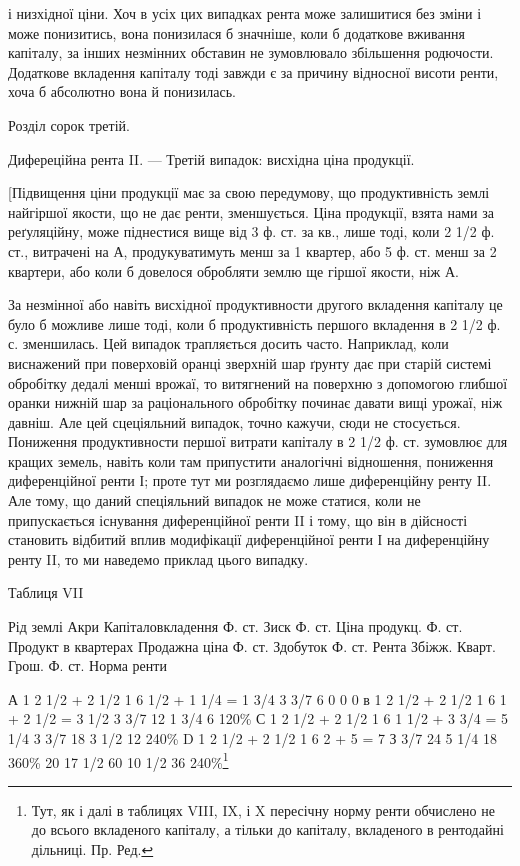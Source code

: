 \parcont{}  %
і низхідної ціни. Хоч в усіх цих випадках рента може залишитися без зміни
і може понизитись, вона понизилася б значніше, коли б додаткове вживання
капіталу, за інших незмінних обставин не зумовлювало збільшення родючости. Додаткове вкладення
капіталу тоді завжди є за причину відносної висоти ренти,
хоча б абсолютно вона й понизилась.

Розділ сорок третій.

Дифереційна рента II. — Третій випадок:
висхідна ціна продукції.

[Підвищення ціни продукції має за свою передумову, що продуктивність землі
найгіршої якости, що не дає ренти, зменшується. Ціна продукції, взята нами за
реґуляційну, може піднестися вище від 3 ф. ст. за кв., лише тоді, коли 2 1/2 ф. ст.,
витрачені на А, продукуватимуть менш за 1 квартер, або 5 ф. ст. менш за
2 квартери, або коли б довелося обробляти землю ще гіршої якости, ніж А.

За незмінної або навіть висхідної продуктивности другого вкладення капіталу
це було б можливе лише тоді, коли б продуктивність першого вкладення в 2 1/2 ф. с.
зменшилась. Цей випадок трапляється досить часто. Наприклад, коли виснажений
при поверховій оранці зверхній шар ґрунту дає при старій системі обробітку
дедалі менші врожаї, то витягнений на поверхню з допомогою глибшої
оранки нижній шар за раціонального обробітку починає давати вищі
урожаї, ніж давніш. Але цей сцеціяльний випадок, точно кажучи, сюди не
стосується. Пониження продуктивности першої витрати капіталу в 2 1/2 ф. ст. зумовлює для кращих
земель, навіть коли там припустити аналогічні відношення,
пониження диференційної ренти І; проте тут ми розглядаємо лише диференційну
ренту II. Але тому, що даний спеціяльний випадок не може статися, коли не
припускається існування диференційної ренти II і тому, що він в дійсності
становить відбитий вплив модифікації диференційної ренти І на диференційну
ренту II, то ми наведемо приклад цього випадку.

Таблиця VII

Рід землі
Акри
Капіталовкладення Ф. ст.
Зиск Ф. ст.
Ціна продукц. Ф. ст.
Продукт в квартерах
Продажна ціна Ф. ст.
Здобуток Ф. ст.
Рента
Збіжж. Кварт.
Грош. Ф. ст.
Норма ренти

А    1    2  1/2 + 2 1/2     1    6      1/2 + 1 1/4 = 1 3/4     3 3/7      6                0      
        0           0
в    1    2  1/2 + 2 1/2     1     6      1 + 2 1/2 = 3 1/2        3 3/7     12               1 3/4 
     6        120\%
С    1    2  1/2 + 2 1/2    1     6      1 1/2 + 3 3/4 = 5 1/4  3 3/7     18               3 1/2    
 12        240\%
D    1    2  1/2 + 2 1/2    1    6       2 + 5 = 7                       З 3/7      24             5
1/4      18        360\%
                      20                                              17 1/2                        
60             10 1/2      36      240\%\footnote*{
Тут, як і далі в таблицях VIII, IX, і X пересічну норму ренти обчислено не до всього
вкладеного капіталу, а тільки до капіталу, вкладеного в рентодайні дільниці. Пр. Ред.
}

